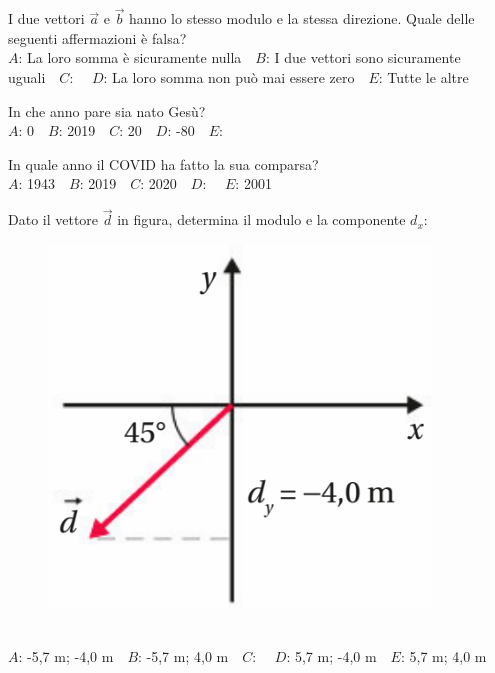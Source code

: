 \mcquestionfooter



\def\mcquestionnumber{6}


\mcquestionheader I due vettori $\vec{a}$ e $\vec{b}$ hanno lo stesso modulo e la stessa direzione. Quale delle seguenti affermazioni è falsa?\\
{$A$}: La loro somma è sicuramente nulla\ \ {$B$}: I due vettori sono sicuramente uguali\ \ {$C$}: \ \ {$D$}: La loro somma non può mai essere zero\ \ {$E$}: Tutte le altre\ \ 

\mcquestionfooter



\def\mcquestionnumber{7}


\mcquestionheader In che anno pare sia nato Gesù?\\
{$A$}: 0\ \ {$B$}: 2019\ \ {$C$}: 20\ \ {$D$}: -80\ \ {$E$}: \ \ 

\mcquestionfooter



\def\mcquestionnumber{8}


\mcquestionheader In quale anno il COVID ha fatto la sua comparsa?\\
{$A$}: 1943\ \ {$B$}: 2019\ \ {$C$}: 2020\ \ {$D$}: \ \ {$E$}: 2001\ \ 

\mcquestionfooter



\def\mcquestionnumber{9}


\mcquestionheader Dato il vettore $\vec{d}$ in figura, determina il modulo e la componente $d_x$: \begin{figure}[h!]   \begin{center}     \includegraphics[scale=0.35]{vettored.png}   \end{center} \end{figure}\\
{$A$}: -5,7 m; -4,0 m\ \ {$B$}: -5,7 m; 4,0 m\ \ {$C$}: \ \ {$D$}: 5,7 m; -4,0 m\ \ {$E$}: 5,7 m; 4,0 m\ \ 

